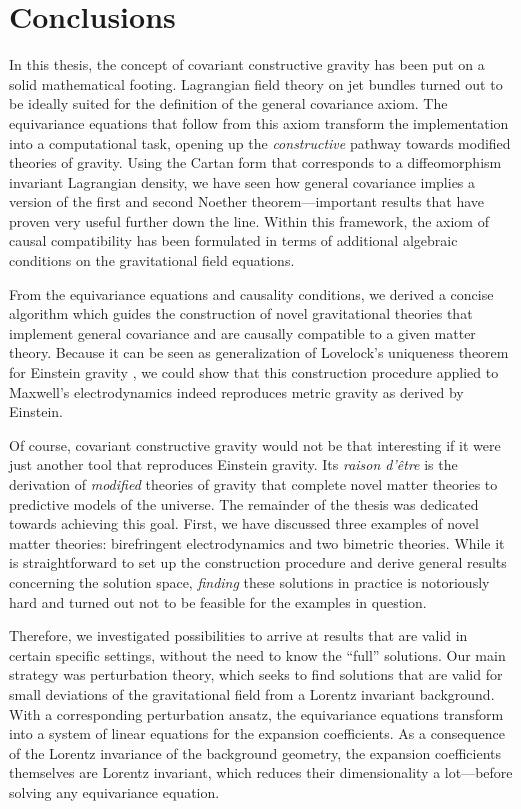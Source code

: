 \chapter{Conclusions}

In this thesis, the concept of covariant constructive gravity has been put on a solid mathematical footing. Lagrangian field theory on jet bundles turned out to be ideally suited for the definition of the general covariance axiom. The equivariance equations that follow from this axiom transform the implementation into a computational task, opening up the \emph{constructive} pathway towards modified theories of gravity. Using the Cartan form that corresponds to a diffeomorphism invariant Lagrangian density, we have seen how general covariance implies a version of the first and second Noether theorem---important results that have proven very useful further down the line. Within this framework, the axiom of causal compatibility has been formulated in terms of additional algebraic conditions on the gravitational field equations.

From the equivariance equations and causality conditions, we derived a concise algorithm which guides the construction of novel gravitational theories that implement general covariance and are causally compatible to a given matter theory. Because it can be seen as generalization of Lovelock's uniqueness theorem for Einstein gravity \cite{Lovelock_1969,Lovelock_1971,Lovelock_1972}, we could show that this construction procedure applied to Maxwell's electrodynamics indeed reproduces metric gravity as derived by Einstein.

Of course, covariant constructive gravity would not be that interesting if it were just another tool that reproduces Einstein gravity. Its \emph{raison d'\^etre} is the derivation of \emph{modified} theories of gravity that complete novel matter theories to predictive models of the universe. The remainder of the thesis was dedicated towards achieving this goal. First, we have discussed three examples of novel matter theories: birefringent electrodynamics and two bimetric theories. While it is straightforward to set up the construction procedure and derive general results concerning the solution space, \emph{finding} these solutions in practice is notoriously hard and turned out not to be feasible for the examples in question.

Therefore, we investigated possibilities to arrive at results that are valid in certain specific settings, without the need to know the ``full'' solutions. Our main strategy was perturbation theory, which seeks to find solutions that are valid for small deviations of the gravitational field from a Lorentz invariant background. With a corresponding perturbation ansatz, the equivariance equations transform into a system of linear equations for the expansion coefficients. As a consequence of the Lorentz invariance of the background geometry, the expansion coefficients themselves are Lorentz invariant, which reduces their dimensionality a lot---before solving any equivariance equation.


